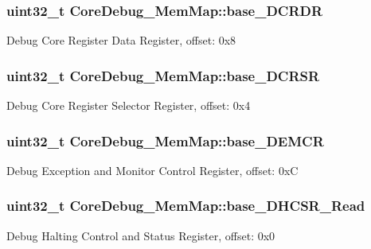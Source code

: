 \subsubsection[{base\+\_\+\+D\+C\+R\+D\+R}]{\setlength{\rightskip}{0pt plus 5cm}uint32\+\_\+t Core\+Debug\+\_\+\+Mem\+Map\+::base\+\_\+\+D\+C\+R\+D\+R}\label{struct_core_debug___mem_map_aac76a717b2aba2ccbf75e020cc71fb3e}
Debug Core Register Data Register, offset\+: 0x8 \hypertarget{struct_core_debug___mem_map_ad9c98f7390e5d3a6b54df56ddea32e8b}{}
\subsubsection[{base\+\_\+\+D\+C\+R\+S\+R}]{\setlength{\rightskip}{0pt plus 5cm}uint32\+\_\+t Core\+Debug\+\_\+\+Mem\+Map\+::base\+\_\+\+D\+C\+R\+S\+R}\label{struct_core_debug___mem_map_ad9c98f7390e5d3a6b54df56ddea32e8b}
Debug Core Register Selector Register, offset\+: 0x4 \hypertarget{struct_core_debug___mem_map_a13a099e668fcb3587b2cd6eb8f8608d5}{}
\subsubsection[{base\+\_\+\+D\+E\+M\+C\+R}]{\setlength{\rightskip}{0pt plus 5cm}uint32\+\_\+t Core\+Debug\+\_\+\+Mem\+Map\+::base\+\_\+\+D\+E\+M\+C\+R}\label{struct_core_debug___mem_map_a13a099e668fcb3587b2cd6eb8f8608d5}
Debug Exception and Monitor Control Register, offset\+: 0x\+C \hypertarget{struct_core_debug___mem_map_a4968901505f61e2a98c9196a8ac7584b}{}
\subsubsection[{base\+\_\+\+D\+H\+C\+S\+R\+\_\+\+Read}]{\setlength{\rightskip}{0pt plus 5cm}uint32\+\_\+t Core\+Debug\+\_\+\+Mem\+Map\+::base\+\_\+\+D\+H\+C\+S\+R\+\_\+\+Read}\label{struct_core_debug___mem_map_a4968901505f61e2a98c9196a8ac7584b}
Debug Halting Control and Status Register, offset\+: 0x0 \hypertarget{struct_core_debug___mem_map_a57de52c8c1eb5789546543f2408ce487}{}

